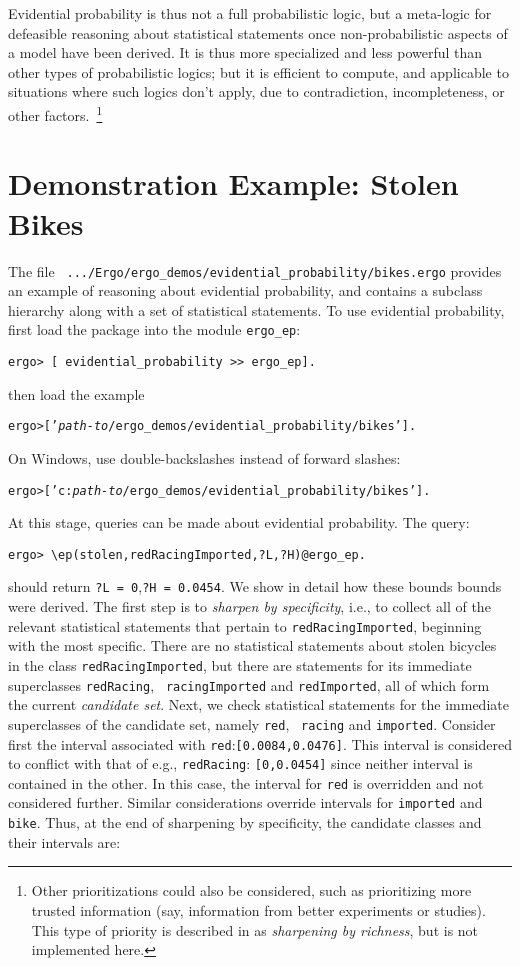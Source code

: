 Evidential probability is thus not a full probabilistic logic, but a
meta-logic for defeasible reasoning about statistical statements once
non-probabilistic aspects of a model have been derived.  It is thus
more specialized and less powerful than other types of probabilistic
logics; but it is efficient to compute, and applicable to situations
where such logics don't apply, due to contradiction, incompleteness,
or other factors.~\footnote{Other prioritizations could also be
  considered, such as prioritizing more trusted information (say,
  information from better experiments or studies).  This type of
  priority is described in \cite{KybTen:2001} as {\em sharpening by
    richness}, but is not implemented here.}

\section*{Demonstration Example: Stolen Bikes}
The file {\tt
  .../Ergo/ergo\_demos/evidential\_probability/bikes.ergo}
provides an example of reasoning about evidential probability, and
contains a subclass hierarchy along with a set of statistical
statements.  To use evidential probability, first load the package
into the module {\tt ergo\_ep}:
%
\begin{verbatim}
ergo> [ evidential_probability >> ergo_ep].
\end{verbatim}
%
then load the example
%
\begin{alltt}
ergo> ['\textit{path-to}/ergo_demos/evidential_probability/bikes'].
\end{alltt}
%
On Windows, use double-backslashes instead of forward slashes:
\begin{alltt}
ergo> ['c:\textit{path-to}/ergo_demos/evidential_probability/bikes'].
\end{alltt}
At this stage, queries can be made about evidential probability.  The query:
%
\begin{verbatim}
ergo> \ep(stolen,redRacingImported,?L,?H)@ergo_ep.
\end{verbatim}
%
should return {\tt ?L = 0},{\tt ?H = 0.0454}.  We show in detail how these
bounds bounds were derived.  The first step is to {\em sharpen by
  specificity}, i.e., to collect all of the relevant statistical
statements that pertain to {\tt redRacingImported}, beginning with the
most specific.  There are no statistical statements about stolen
bicycles in the class {\tt redRacingImported}, but there are
statements for its immediate superclasses {\tt redRacing}, {\tt
  racingImported} and {\tt redImported}, all of which form the current
{\em candidate set}.  Next, we check statistical statements for the
immediate superclasses of the candidate set, namely {\tt red}, {\tt
  racing} and {\tt imported}.  Consider first the interval associated
with {\tt red}:{\tt [0.0084,0.0476]}.  This interval is considered to
conflict with that of e.g., {\tt redRacing}: {\tt [0,0.0454]} since
neither interval is contained in the other.  In this case, the
interval for {\tt red} is overridden and not considered further.
Similar considerations override intervals for {\tt imported} and
{\tt bike}.  Thus, at the end of sharpening by specificity, the
candidate classes and their intervals are:

